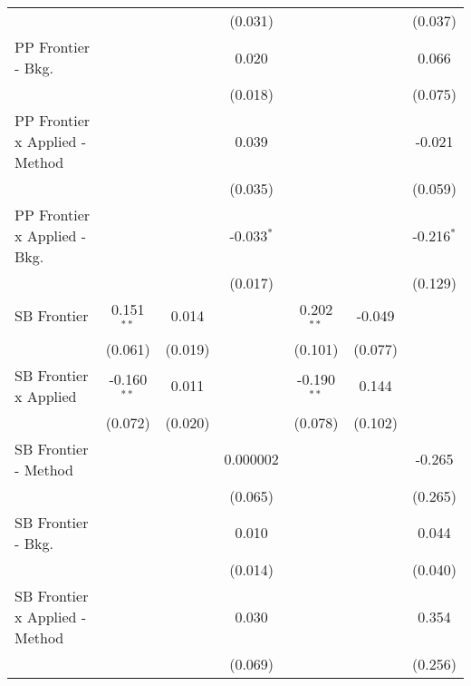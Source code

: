 \begin{tabular}{lcccccc}
                                  &               &              & (0.031)      &               &         & (0.037)\\   
   PP Frontier - Bkg.             &               &              & 0.020        &               &         & 0.066\\   
                                  &               &              & (0.018)      &               &         & (0.075)\\   
   PP Frontier x Applied - Method &               &              & 0.039        &               &         & -0.021\\   
                                  &               &              & (0.035)      &               &         & (0.059)\\   
   PP Frontier x Applied - Bkg.   &               &              & -0.033$^{*}$ &               &         & -0.216$^{*}$\\   
                                  &               &              & (0.017)      &               &         & (0.129)\\   
   SB Frontier                    & 0.151$^{**}$  & 0.014        &              & 0.202$^{**}$  & -0.049  &   \\   
                                  & (0.061)       & (0.019)      &              & (0.101)       & (0.077) &   \\   
   SB Frontier x Applied          & -0.160$^{**}$ & 0.011        &              & -0.190$^{**}$ & 0.144   &   \\   
                                  & (0.072)       & (0.020)      &              & (0.078)       & (0.102) &   \\   
   SB Frontier - Method           &               &              & 0.000002     &               &         & -0.265\\   
                                  &               &              & (0.065)      &               &         & (0.265)\\   
   SB Frontier - Bkg.             &               &              & 0.010        &               &         & 0.044\\   
                                  &               &              & (0.014)      &               &         & (0.040)\\   
   SB Frontier x Applied - Method &               &              & 0.030        &               &         & 0.354\\   
                                  &               &              & (0.069)      &               &         & (0.256)\\   

\end{tabular}
